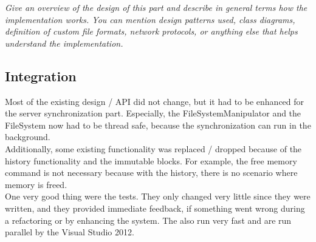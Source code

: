 \documentclass[JCDReport.tex]{subfiles}
\begin{document}
\emph{Give an overview of the design of this part and describe in general terms how the implementation works. You can mention design patterns used, class diagrams, definition of custom file formats, network protocols, or anything else that helps understand the implementation.}


\subsection{Integration}


Most of the existing design / API did not change, but it had to be enhanced for the server synchronization part. Especially, the FileSystemManipulator and the FileSystem now had to be thread safe, because the synchronization can run in the background.\\

Additionally, some existing functionality was replaced / dropped because of the history functionality and the immutable blocks. For example, the free memory command is not necessary because with the history, there is no scenario where memory is freed.\\

One very good thing were the tests. They only changed very little since they were written, and they provided immediate feedback, if something went wrong during a refactoring or by enhancing the system. The also run very fast and are run parallel by the Visual Studio 2012.
\end{document}
